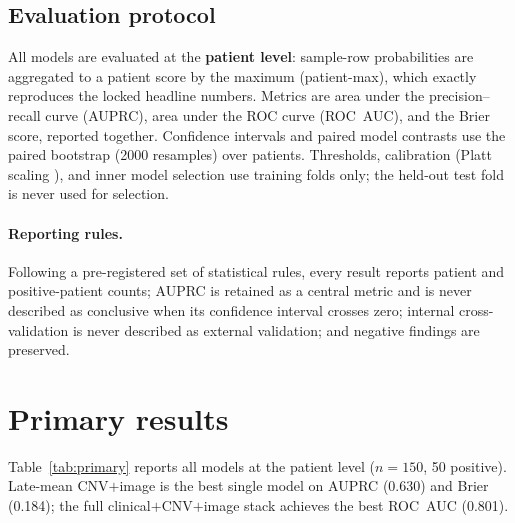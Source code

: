 \subsection{Evaluation protocol}
All models are evaluated at the \textbf{patient level}: sample-row probabilities
are aggregated to a patient score by the maximum (patient-max), which exactly
reproduces the locked headline numbers. Metrics are area under the
precision--recall curve (AUPRC), area under the ROC curve (ROC~AUC), and the
Brier score, reported together. Confidence intervals and paired model contrasts
use the paired bootstrap (2000 resamples) over patients. Thresholds, calibration
(Platt scaling \cite{platt1999}), and inner model selection use training folds
only; the held-out test fold is never used for selection.

\paragraph{Reporting rules.} Following a pre-registered set of statistical
rules, every result reports patient and positive-patient counts; AUPRC is
retained as a central metric and is never described as conclusive when its
confidence interval crosses zero; internal cross-validation is never described
as external validation; and negative findings are preserved.

\section{Primary results}
\label{sec:primary}

Table~\ref{tab:primary} reports all models at the patient level ($n=150$,
50 positive). Late-mean CNV$+$image is the best single model on AUPRC (0.630)
and Brier (0.184); the full clinical$+$CNV$+$image stack achieves the best
ROC~AUC (0.801).

